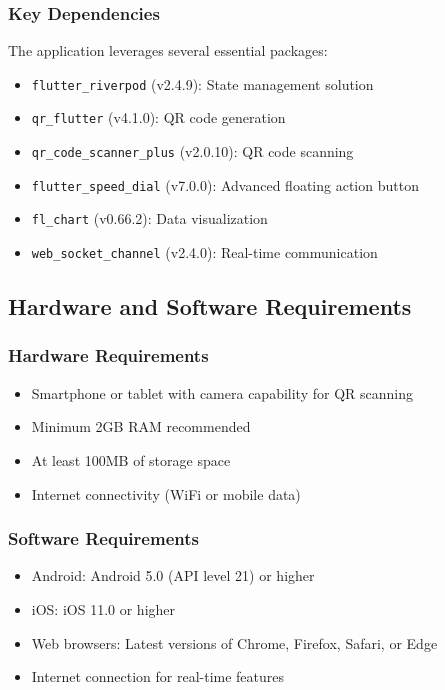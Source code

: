 \subsubsection{Key Dependencies}
The application leverages several essential packages:
\begin{itemize}
    \item \texttt{flutter\_riverpod} (v2.4.9): State management solution
    \item \texttt{qr\_flutter} (v4.1.0): QR code generation
    \item \texttt{qr\_code\_scanner\_plus} (v2.0.10): QR code scanning
    \item \texttt{flutter\_speed\_dial} (v7.0.0): Advanced floating action button
    \item \texttt{fl\_chart} (v0.66.2): Data visualization
    \item \texttt{web\_socket\_channel} (v2.4.0): Real-time communication
\end{itemize}

\subsection{Hardware and Software Requirements}

\subsubsection{Hardware Requirements}
\begin{itemize}
    \item Smartphone or tablet with camera capability for QR scanning
    \item Minimum 2GB RAM recommended
    \item At least 100MB of storage space
    \item Internet connectivity (WiFi or mobile data)
\end{itemize}

\subsubsection{Software Requirements}
\begin{itemize}
    \item Android: Android 5.0 (API level 21) or higher
    \item iOS: iOS 11.0 or higher
    \item Web browsers: Latest versions of Chrome, Firefox, Safari, or Edge
    \item Internet connection for real-time features
\end{itemize}

